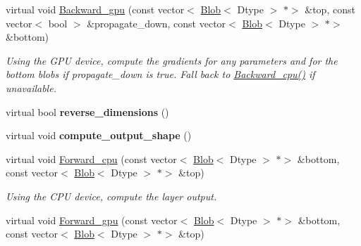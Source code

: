 \begin{DoxyCompactItemize}
\mbox{\label{classcaffe_1_1_deconvolution_layer_ab7c4889f3460d4ca2c291c2d10de0d98}} 
virtual void \mbox{\hyperlink{classcaffe_1_1_deconvolution_layer_ab7c4889f3460d4ca2c291c2d10de0d98}{Backward\+\_\+gpu}} (const vector$<$ \mbox{\hyperlink{classcaffe_1_1_blob}{Blob}}$<$ Dtype $>$ $\ast$$>$ \&top, const vector$<$ bool $>$ \&propagate\+\_\+down, const vector$<$ \mbox{\hyperlink{classcaffe_1_1_blob}{Blob}}$<$ Dtype $>$ $\ast$$>$ \&bottom)
\begin{DoxyCompactList}\small\item\em Using the G\+PU device, compute the gradients for any parameters and for the bottom blobs if propagate\+\_\+down is true. Fall back to \mbox{\hyperlink{classcaffe_1_1_deconvolution_layer_a43c00eac97e8c9b3cfb0de0b5904b43f}{Backward\+\_\+cpu()}} if unavailable. \end{DoxyCompactList}\item 
\mbox{\label{classcaffe_1_1_deconvolution_layer_aa71cf7a9ff4cebe12721783070f49588}} 
virtual bool {\bfseries reverse\+\_\+dimensions} ()
\item 
\mbox{\label{classcaffe_1_1_deconvolution_layer_a81da6f09a0b00db0f0e1a4e5fe2cb4ee}} 
virtual void {\bfseries compute\+\_\+output\+\_\+shape} ()
\item 
\mbox{\label{classcaffe_1_1_deconvolution_layer_a1a11e78c26c1b9869784b6d2a73a003c}} 
virtual void \mbox{\hyperlink{classcaffe_1_1_deconvolution_layer_a1a11e78c26c1b9869784b6d2a73a003c}{Forward\+\_\+cpu}} (const vector$<$ \mbox{\hyperlink{classcaffe_1_1_blob}{Blob}}$<$ Dtype $>$ $\ast$$>$ \&bottom, const vector$<$ \mbox{\hyperlink{classcaffe_1_1_blob}{Blob}}$<$ Dtype $>$ $\ast$$>$ \&top)
\begin{DoxyCompactList}\small\item\em Using the C\+PU device, compute the layer output. \end{DoxyCompactList}\item 
\mbox{\label{classcaffe_1_1_deconvolution_layer_a7cc6c8c75dc09c0e990135a175f84f02}} 
virtual void \mbox{\hyperlink{classcaffe_1_1_deconvolution_layer_a7cc6c8c75dc09c0e990135a175f84f02}{Forward\+\_\+gpu}} (const vector$<$ \mbox{\hyperlink{classcaffe_1_1_blob}{Blob}}$<$ Dtype $>$ $\ast$$>$ \&bottom, const vector$<$ \mbox{\hyperlink{classcaffe_1_1_blob}{Blob}}$<$ Dtype $>$ $\ast$$>$ \&top)

\end{DoxyCompactItemize}
